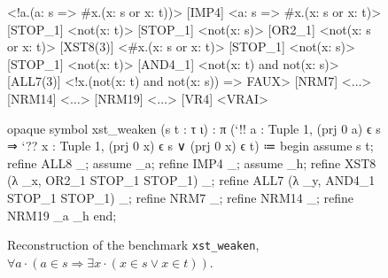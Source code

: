 \begin{figure}[t]
  \centering
  \begin{minipage}[c]{0.51\linewidth}\centering
\begin{codePP}
[ALL8(1)] <!a.(a: s => #x.(x: s or x: t))>
[IMP4] <a: s => #x.(x: s or x: t)>
[STOP_1] <not(x: t)>
[STOP_1] <not(x: s)>
[OR2_1] <not(x: s or x: t)>
[XST8(3)] <#x.(x: s or x: t)>
[STOP_1] <not(x: s)>
[STOP_1] <not(x: t)>
[AND4_1] <not(x: t) and not(x: s)>
[ALL7(3)] <!x.(not(x: t) and not(x: s)) => FAUX>
[NRM7] <$\ldots$>
[NRM14] <$\ldots$>
[NRM19] <$\ldots$>
[VR4] <VRAI>
\end{codePP}
  \end{minipage}\hfill
  \begin{minipage}[c]{0.47\linewidth}\centering
\begin{codeLP}
opaque symbol xst_weaken (s t : τ ι) :
  π (`!! a : Tuple 1, (prj 0 a) ϵ s
     ⇒ `?? x : Tuple 1,
          (prj 0 x) ϵ s ∨ (prj 0 x) ϵ t) ≔
begin
  assume s t;
  refine ALL8 _; assume _a;
  refine IMP4 _; assume _h;
  refine XST8 (λ _x, OR2_1 STOP_1 STOP_1) _;
  refine ALL7 (λ _y, AND4_1 STOP_1 STOP_1) _;
  refine NRM7 _; refine NRM14 _;
  refine NRM19 _a _h
end;
\end{codeLP}
  \end{minipage}
  \caption{Reconstruction of the benchmark \texttt{xst\_weaken},
    $\forall a \cdot (a \in s \Rightarrow \exists x \cdot (x \in s \lor x \in t))$.}
  \label{fig:reconstruct}
\end{figure}
